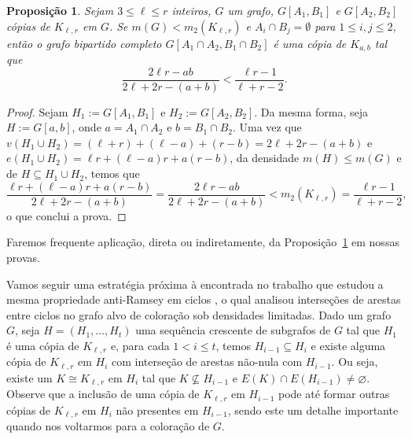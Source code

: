 \documentclass[12pt,a4paper]{book}
\newcommand{\K}{K_{\ell,r}} %
\let\subset\subseteq
\newtheorem{proposicao} [teorema] {Proposição}
\begin{document}
    \begin{proposicao}
        \label{lemma:inter_a} 
    Sejam $3\leq \ell \leq r$ inteiros, $G$ um grafo, $G[A_1,B_1]$ e $G[A_2,B_2]$ cópias de $K_{\ell,r}$ em $G$. 
    Se $m(G) < m_2(\K)$ e
    $A_i \cap B_j = \emptyset$ 
    para $1\leq i,j\leq 2$, então o grafo bipartido completo
    $G[A_1\cap A_2, B_1\cap B_2]$ é uma cópia de $K_{a,b}$ tal que
      \begin{equation}
         \label{eq:pairs-ab} 
    	 \frac{2\ell r - ab}{2\ell + 2r - (a+b)} <
    \frac{\ell r - 1}{\ell + r - 2}.
      \end{equation}
      \end{proposicao}
    \begin{proof}
    Sejam $H_1:=G[A_1,B_1]$ e ${H_2:=G[A_2,B_2]}$.
    Da mesma forma, seja $H := G[a,b]$, onde $a = A_1\cap
    A_2$ e $b = B_1\cap B_2$.  
    Uma vez que 
    $v(H_1 \cup H_2) = (\ell + r) +
    (\ell-a) + (r - b) = 2\ell + 2r - (a+b)$ 
    e $e(H_1 \cup H_2) = \ell r + (\ell-a)r + a(r-b)$, 
    da densidade $m(H) \leq m(G)$ e de $H\subset H_1\cup
    H_2$, temos que
      \begin{equation*} 
      \frac{\ell r + (\ell-a)r + a(r-b)}{2\ell + 2r -
    (a+b)} = \frac{2\ell r - ab}{2\ell + 2r - (a+b)} < m_2(\K) = \frac{\ell r -
    1}{\ell + r - 2},
      \end{equation*}
      o que conclui a prova.
    \end{proof}
    
    Faremos frequente aplicação, direta ou indiretamente, da Proposição~\ref{lemma:inter_a} em nossas provas.
     
     Vamos seguir uma estratégia próxima à encontrada no trabalho que estudou  a mesma propriedade anti-Ramsey em ciclos \cite{barros2021anti}, o qual analisou interseções de arestas entre ciclos no grafo alvo de coloração sob densidades limitadas.
     Dado um grafo $G$, seja $H = (H_1, \ldots, H_t)$ uma sequência crescente de subgrafos de $G$ tal que
    $H_1$ é uma cópia de $\K$ e, para cada $1 < i \leq t$, temos $H_{i-1} \subseteq H_i$ e existe alguma cópia de $\K$ em $H_{i}$ com interseção de arestas não-nula com $H_{i-1}$. 
    Ou seja, existe um $K \cong \K$ em $H_{i}$ tal que $K \not\subset H_{i-1}$ e $E(K) \cap E(H_{i-1}) \neq\varnothing$.
     Observe que a inclusão de uma cópia de $\K$ em $H_{i-1}$ pode até formar outras cópias de $\K$ em $H_{i}$ não presentes em $H_{i-1}$, sendo este um detalhe importante quando nos voltarmos para a coloração de $G$.
     
\end{document}
